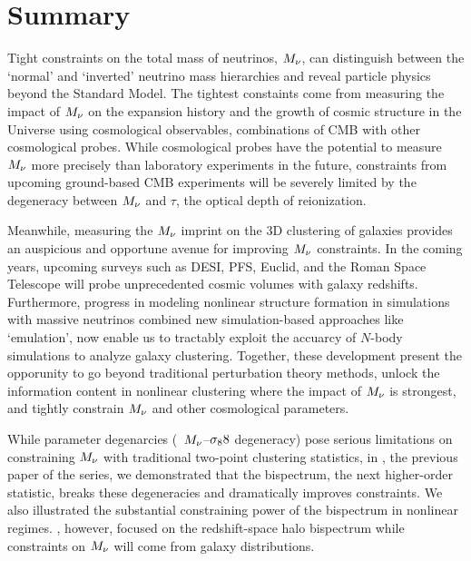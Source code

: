 \section{Summary} \label{sec:summary} 
Tight constraints on the total mass of neutrinos, $M_\nu$, can distinguish
between the `normal' and `inverted' neutrino mass hierarchies and reveal
particle physics beyond the Standard Model. The tightest constaints come from
measuring the impact of $M_\nu$ on the expansion history and the growth of
cosmic structure in the Universe using cosmological observables, 
combinations of CMB with other cosmological probes. While cosmological probes
have the potential to measure $M_\nu$ more precisely than laboratory
experiments in the future, constraints from upcoming ground-based CMB
experiments will be severely limited by the degeneracy between $M_\nu$ and
$\tau$, the optical depth of reionization. 


Meanwhile, measuring the $M_\nu$ imprint on the 3D clustering of galaxies
provides an auspicious and opportune avenue for improving $M_\nu$ constraints. 
In the coming years, upcoming surveys such as DESI, PFS, Euclid, and the
Roman Space Telescope will probe unprecedented cosmic volumes with galaxy
redshifts. Furthermore, progress in modeling nonlinear structure formation in 
simulations with massive neutrinos combined new simulation-based approaches
like `emulation', now enable us to tractably exploit the accuarcy of $N$-body
simulations to analyze galaxy clustering. Together, these development present 
the opporunity to go beyond traditional perturbation theory methods, unlock the
information content in nonlinear clustering where the impact of $M_\nu$ is
strongest, and tightly constrain $M_\nu$ and other cosmological parameters. 


While parameter degenarcies (\eg~$M_\nu$--$\sigma_88$ degeneracy) pose serious
limitations on constraining $M_\nu$ with traditional two-point clustering 
statistics, in \cite{hahn2020}, the previous paper of the series, we
demonstrated that the bispectrum, the next higher-order statistic, breaks
these degeneracies and dramatically improves constraints. We also illustrated 
the substantial constraining power of the bispectrum in nonlinear regimes.
\cite{hahn2020}, however, focused on the redshift-space halo bispectrum while 
constraints on $M_\nu$ will come from galaxy distributions. %


